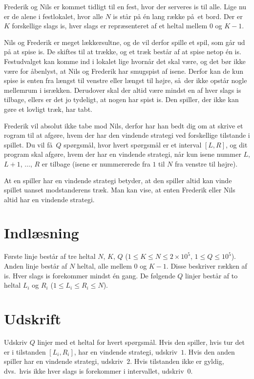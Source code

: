 Frederik og Nils er kommet tidligt til en fest, hvor der serveres is til alle.
Lige nu er de alene i festlokalet, hvor alle $N$ is står på én lang række på et bord.
Der er $K$ forskellige slags is, hver slags er repræsenteret af et heltal mellem $0$ og $K-1$.

Nils og Frederik er meget lækkersultne, og de vil derfor spille et spil, som går ud på at spise is.
De skiftes til at trække, og et træk består af at spise netop én is.
Festudvalget kan komme ind i lokalet lige hvornår det skal være, og det bør ikke være for åbenlyst, at Nils og Frederik har smugspist af isene.
Derfor kan de kun spise is enten fra længst til venstre eller længst til højre, så der ikke opstår nogle mellemrum i isrækken.
Derudover skal der altid være mindst en af hver slags is tilbage, ellers er det jo tydeligt, at nogen har spist is.
Den spiller, der ikke kan gøre et lovligt træk, har tabt.

Frederik vil absolut ikke tabe mod Nils, derfor har han bedt dig om at skrive et rogram til at afgøre, hvem der har den vindende strategi ved forskellige tilstande i spillet.
Du vil få $Q$ spørgsmål, hvor hvert spørgsmål er et interval $[L,R]$, og dit program skal afgøre, hvem der har en vindende strategi, når kun isene nummer $L$, $L+1$, $\dots$, $R$ er tilbage (isene er nummererede fra $1$ til $N$ fra venstre til højre).

At en spiller har en vindende strategi betyder, at den spiller altid kan vinde spillet uanset modstanderens træk.
Man kan vise, at enten Frederik eller Nils altid har en vindende strategi.

\section*{Indlæsning}
Første linje består af tre heltal $N$, $K$, $Q$ ($1 \le K \le N \le 2 \times 10^5$, $1 \le Q \le 10^5$).
Anden linje består af $N$ heltal, alle mellem $0$ og $K-1$.
Disse beskriver rækken af is.
Hver slags is forekommer mindst én gang.
De følgende $Q$ linjer består af to heltal $L_i$ og $R_i$ ($1 \le L_i \le R_i \le N$).

\section*{Udskrift}
Udskriv $Q$ linjer med et heltal for hvert spørgsmål.
Hvis den spiller, hvis tur det er i tilstanden $[L_i, R_i]$, har en vindende strategi, udskriv~$1$.
Hvis den anden spiller har en vindende strategi, udskriv~$2$.
Hvis tilstanden ikke er gyldig, dvs.\ hvis ikke hver slags is forekommer i intervallet, udskriv~$0$.

